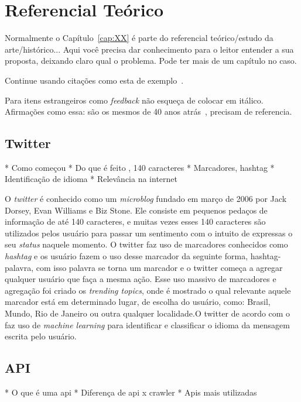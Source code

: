 \chapter{Referencial Teórico}\label{cap:referencial_teorico}

Normalmente o Capítulo~\ref{cap:XX} é parte do referencial teórico/estudo da arte/histórico... Aqui você precisa dar conhecimento para o leitor entender a sua proposta, deixando claro qual o problema. Pode ter mais de um capítulo no caso.


Continue usando citações como esta de exemplo~\cite{fangxing2010,gungor2011}.

Para itens estrangeiros como \textit{feedback}  não esqueça de colocar em itálico. Afirmações como essa: são os mesmos de 40 anos atrás~\cite{gungor2011}, precisam de referencia. 

\section{Twitter}\label{sec:twitter}

* Como começou
* Do que é feito , 140 caracteres
* Marcadores, hashtag
* Identificação de idioma
* Relevância na internet

O \textit{twitter} é conhecido como um \textit{microblog} fundado em março de 2006 por Jack Dorsey, Evan Williams e Biz Stone. Ele consiste em pequenos pedaços de informação de até 140 caracteres, e muitas vezes esses 140 caracteres são utilizados pelos usuário para passar um sentimento com o intuito de expressas o seu \textit{status} naquele momento. O twitter faz uso de marcadores conhecidos como \textit{hashtag}
e os usuário fazem o uso desse marcador da seguinte forma, hashtag-palavra, com isso palavra se torna um marcador e o twitter começa a agregar qualquer usuário que faça a mesma ação. Esse uso massivo de marcadores e agregação foi criado os \textit{trending topics}, onde é mostrado o qual relevante aquele marcador está em determinado lugar, de escolha do usuário, como: Brasil, Mundo, Rio de Janeiro ou outra qualquer localidade.O twitter de acordo com o \cite{arneromannkurrik2013} faz uso de \textit{machine learning} para identificar e classificar o idioma da mensagem escrita pelo usuário.


\section{API}\label{sec:api}
* O que é uma api
* Diferença de api x crawler
* Apis mais utilizadas


